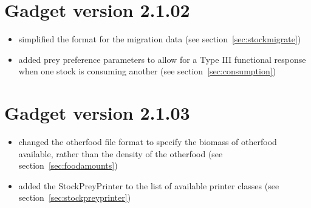 \documentclass[10pt,twoside]{book}
\begin{document}
\section{Gadget version 2.1.02}\label{sec:v2102}
\begin{itemize}
\item simplified the format for the migration data (see section~\ref{sec:stockmigrate})
\item added prey preference parameters to allow for a Type III functional response when one stock is consuming another (see section~\ref{sec:consumption})
\end{itemize}

\section{Gadget version 2.1.03}\label{sec:v2103}
\begin{itemize}
\item changed the otherfood file format to specify the biomass of otherfood available, rather than the density of the otherfood (see section~\ref{sec:foodamounts})
\item added the StockPreyPrinter to the list of available printer classes (see section~\ref{sec:stockpreyprinter})
\end{itemize}
\end{document}
